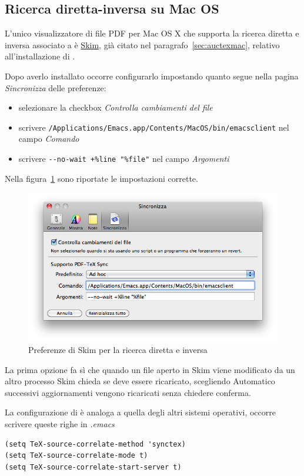 \documentclass[11pt,a4paper]{article}
\begin{document}
\subsection{Ricerca diretta-inversa su Mac OS}
\label{sec:fismac}

L'unico visualizzatore di file PDF per Mac OS X che supporta la
ricerca diretta e inversa associato a \emacs{} è
\href{http://skim-app.sourceforge.net/}{Skim}, già citato nel
paragrafo~\ref{sec:auctexmac}, relativo all'installazione di
\auctex{}.

Dopo averlo installato occorre configurarlo impostando quanto segue
nella pagina \emph{Sincronizza} delle preferenze:
\begin{itemize}
\item selezionare la checkbox \emph{Controlla cambiamenti del file}
\item scrivere
  \verb!/Applications/Emacs.app/Contents/MacOS/bin/emacsclient!  nel
  campo \emph{Comando}
\item scrivere \verb!--no-wait +%line "%file"! nel campo
  \emph{Argomenti}
\end{itemize}
Nella figura~\ref{fig:skimpref} sono riportate le impostazioni
corrette.
\begin{figure}[tb]
  \centering
  \includegraphics[width=\textwidth]{preferenze-Skim}
  \caption{Preferenze di Skim per la ricerca diretta e inversa}
  \label{fig:skimpref}
\end{figure}

La prima opzione fa sì che quando un file aperto in Skim viene
modificato da un altro processo Skim chieda se deve essere ricaricato,
scegliendo Automatico successivi aggiornamenti vengono ricaricati
senza chiedere conferma.

La configurazione di \emacs{} è analoga a quella degli altri sistemi
operativi, occorre scrivere queste righe in \emph{.emacs}
\begin{Verbatim}
(setq TeX-source-correlate-method 'synctex)
(setq TeX-source-correlate-mode t)
(setq TeX-source-correlate-start-server t)
\end{Verbatim}
\end{document}
